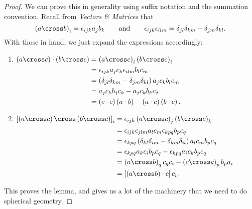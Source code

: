 \begin{proof}
	We can prove this in generality using suffix notation and the summation convention. Recall from \emph{Vectors \& Matrices} that
	\begin{equation*}
		\left( \va \cross \vb \right)_i = \epsilon_{ijk} a_j b_k
		\qquad \text{and} \qquad
		\epsilon_{ijk} \epsilon_{ilm} = \delta_{jl} \delta_{km} - \delta_{jm} \delta_{kl}.
	\end{equation*}
	With those in hand, we just expand the expressions accordingly:
	\begin{enumerate}
		\item \(\begin{aligned}[t]
			\left( \va \cross \vc \right) \cdot \left( \vb \cross \vc \right)
			&= \left( \va \cross \vc \right)_i \left( \vb \cross \vc \right)_i \\
			&= \epsilon_{ijk} a_j c_k \epsilon_{ilm} b_l c_m \\
			&= \left( \delta_{jl} \delta_{km} - \delta_{jm} \delta_{kl} \right) a_j c_k b_l c_m \\
			&= a_j c_k b_j c_k - a_j c_k b_k c_j \\
			&= \left( \vc\cdot\vc \right)\left( \va\cdot\vb \right) - \left( \va\cdot\vc \right)\left( \vb\cdot\vc \right).
		\end{aligned}\)
		\item \(\begin{aligned}[t]
			\left[ \left( \va\cross\vc \right) \cross \left( \vb\cross\vc \right) \right]_i
			&= \epsilon_{ijk} \left( \va\cross \vc \right)_j \left( \vb\cross\vc \right)_k \\
			&= \epsilon_{ijk} \epsilon_{jlm} a_l c_m \epsilon_{kpq} b_p c_q \\
			&= \epsilon_{kpq} \left( \delta_{kl} \delta_{im} - \delta_{km} \delta_{il} \right) a_l c_m b_p c_q \\
			&= \epsilon_{kpq} a_k c_i b_p c_q - \epsilon_{kpq} a_i c_k b_p c_q \\
			&= \left( \va\cross\vb \right)_q c_q c_i - \left( \vc\cross\vc \right)_p b_p a_i \\
			&= \left[ \left( \va\cross\vb \right) \cdot \vc \right] c_i.
		\end{aligned}\)
	\end{enumerate}
	This proves the lemma, and gives us a lot of the machinery that we need to do spherical geometry.
\end{proof}

	
